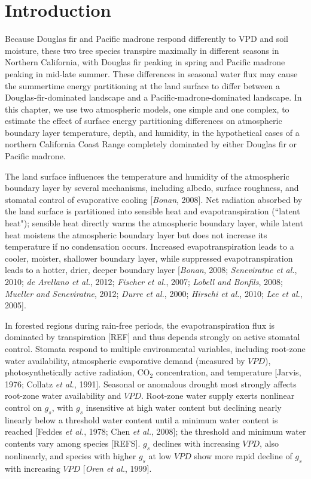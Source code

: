 \section{Introduction}

Because Douglas fir and Pacific madrone respond differently to VPD and soil moisture, these two tree species transpire maximally in different seasons in Northern California, with Douglas fir peaking in spring and Pacific madrone peaking in mid-late summer.  These differences in seasonal water flux may cause the summertime energy partitioning at the land surface to differ between a Douglas-fir-dominated landscape and a Pacific-madrone-dominated landscape.  In this chapter, we use two atmospheric models, one simple and one complex, to estimate the effect of surface energy partitioning differences on atmospheric boundary layer temperature, depth, and humidity, in the hypothetical cases of a northern California Coast Range completely dominated by either Douglas fir or Pacific madrone.

The land surface influences the temperature and humidity of the atmospheric boundary layer by several mechanisms, including albedo, surface roughness, and stomatal control of evaporative cooling [\textit{Bonan}, 2008].  Net radiation absorbed by the land surface is partitioned into sensible heat and evapotranspiration (``latent heat"); sensible heat directly warms the atmospheric boundary layer, while latent heat moistens the atmospheric boundary layer but does not increase its temperature if no condensation occurs.  Increased evapotranspiration leads to a cooler, moister, shallower boundary layer, while suppressed evapotranspiration leads to a hotter, drier, deeper boundary layer [\textit{Bonan}, 2008; \textit{Seneviratne et al.}, 2010; \textit{de Arellano et al.}, 2012; \textit{Fischer et al.}, 2007; \textit{Lobell and Bonfils}, 2008; \textit{Mueller and Seneviratne}, 2012; \textit{Durre et al.}, 2000; \textit{Hirschi et al.}, 2010; \textit{Lee et al.}, 2005].  

In forested regions during rain-free periods, the evapotranspiration flux is dominated by transpiration [REF] and thus depends strongly on active stomatal control.  Stomata respond to multiple environmental variables, including root-zone water availability, atmospheric evaporative demand (measured by $VPD$), photosynthetically active radiation, CO$_2$ concentration, and temperature [Jarvis, 1976; Collatz \textit{et al.}, 1991].  Seasonal or anomalous drought most strongly affects root-zone water availability and $VPD$.  Root-zone water supply exerts nonlinear control on $g_s$, with $g_s$ insensitive at high water content but declining nearly linearly below a threshold water content until a minimum water content is reached [Feddes \textit{et al.}, 1978; Chen \textit{et al.}, 2008]; the threshold and minimum water contents vary among species [REFS].  $g_s$ declines with increasing $VPD$, also nonlinearly, and species with higher $g_s$ at low $VPD$ show more rapid decline of $g_s$ with increasing $VPD$ [\textit{Oren et al.}, 1999].

